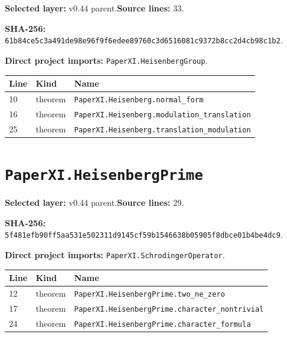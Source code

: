 \documentclass[10pt,oneside]{book}
\begin{document}
\textbf{Selected layer:} v0.44 parent.\quad\textbf{Source lines:} 33.\par\textbf{SHA-256:} {\scriptsize\nolinkurl{61b84ce5c3a491de98e96f9f6edee89760c3d6516081c9372b8cc2d4cb98c1b2}}.


\textbf{Direct project imports:} \nolinkurl{PaperXI.HeisenbergGroup}.

\begin{longtable}{@{}p{}p{}p{}@{}}\toprule Line&Kind&Name\\\midrule\endhead

10&theorem&\nolinkurl{PaperXI.Heisenberg.normal_form}\\

16&theorem&\nolinkurl{PaperXI.Heisenberg.modulation_translation}\\

25&theorem&\nolinkurl{PaperXI.Heisenberg.translation_modulation}\\

\bottomrule\end{longtable}

\section{\texorpdfstring{\nolinkurl{PaperXI.HeisenbergPrime}}{PaperXI.HeisenbergPrime}}\label{module:PaperXI.HeisenbergPrime}

\textbf{Selected layer:} v0.44 parent.\quad\textbf{Source lines:} 29.\par\textbf{SHA-256:} {\scriptsize\nolinkurl{5f481efb90ff5aa531e502311d9145cf59b1546638b05905f8dbce01b4be4dc9}}.


\textbf{Direct project imports:} \nolinkurl{PaperXI.SchrodingerOperator}.

\begin{longtable}{@{}p{}p{}p{}@{}}\toprule Line&Kind&Name\\\midrule\endhead

12&theorem&\nolinkurl{PaperXI.HeisenbergPrime.two_ne_zero}\\

17&theorem&\nolinkurl{PaperXI.HeisenbergPrime.character_nontrivial}\\

24&theorem&\nolinkurl{PaperXI.HeisenbergPrime.character_formula}\\

\bottomrule\end{longtable}
\end{document}
